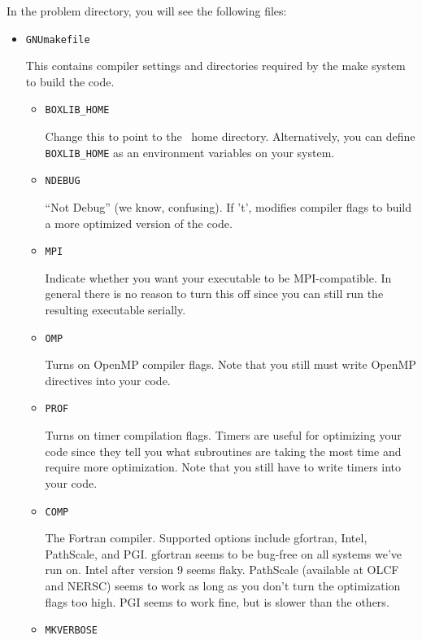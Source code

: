 In the problem directory, you will see the following files:
\begin{itemize}
\item {\tt GNUmakefile}

This contains compiler settings and directories required by the make system to build the code.

  \begin{itemize}

    \item {\tt BOXLIB\_HOME}

    Change this to point to the \BoxLib\ home directory.  Alternatively, you can define {\tt BOXLIB\_HOME}
    as an environment variables on your system.

    \item {\tt NDEBUG}
      
    ``Not Debug'' (we know, confusing).  If 't', modifies compiler flags to build a more optimized version
    of the code.

    \item {\tt MPI}

    Indicate whether you want your executable to be MPI-compatible.  In general there is no reason to turn this
    off since you can still run the resulting executable serially.

    \item {\tt OMP}

    Turns on OpenMP compiler flags.  Note that you still must write OpenMP directives into your code.

    \item {\tt PROF}

    Turns on timer compilation flags.  Timers are useful for optimizing your code since they tell you 
    what subroutines are taking the most time and require more optimization.  Note that you still have 
    to write timers into your code.

    \item {\tt COMP}

    The Fortran compiler.  Supported options include gfortran, Intel, PathScale, and PGI.  gfortran seems to 
    be bug-free on all systems we've run on.  Intel after version 9 seems flaky.  PathScale (available at 
    OLCF and NERSC) seems to work as long as you don't turn the optimization flags too high.  PGI seems to 
    work fine, but is slower than the others.

    \item {\tt MKVERBOSE}


\end{itemize}
\end{itemize}
